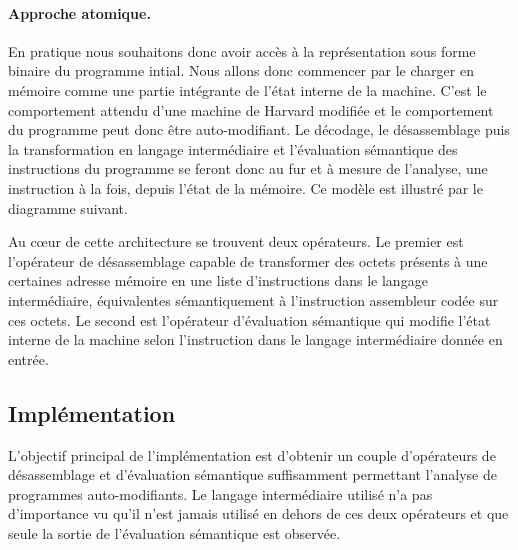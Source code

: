 


\paragraph{Approche atomique.}
En pratique nous souhaitons donc avoir accès à la représentation sous forme binaire du programme intial.
Nous allons donc commencer par le charger en mémoire comme une partie intégrante de l'état interne de la machine.
C'est le comportement attendu d'une machine de Harvard modifiée  et le comportement du programme peut donc être auto-modifiant. Le décodage, le désassemblage puis la transformation en langage intermédiaire et l'évaluation sémantique des instructions du programme se feront donc au fur et à mesure de l'analyse, une instruction à la fois, depuis l'état de la mémoire.
Ce modèle est illustré par le diagramme suivant.

Au c\oe ur de cette architecture se trouvent deux opérateurs. Le premier est l'opérateur de désassemblage capable de transformer des octets présents à une certaines adresse mémoire en une liste d'instructions dans le langage intermédiaire, équivalentes sémantiquement à l'instruction assembleur codée sur ces octets.
Le second est l'opérateur d'évaluation sémantique qui modifie l'état interne de la machine selon l'instruction dans le langage intermédiaire donnée en entrée.

\subsection{Implémentation}
L'objectif principal de l'implémentation est d'obtenir un couple d'opérateurs de désassemblage et d'évaluation sémantique suffisamment permettant l'analyse de programmes auto-modifiants.
Le langage intermédiaire utilisé n'a pas d'importance vu qu'il n'est jamais utilisé en dehors de ces deux opérateurs et que seule la sortie de l'évaluation sémantique est observée.

